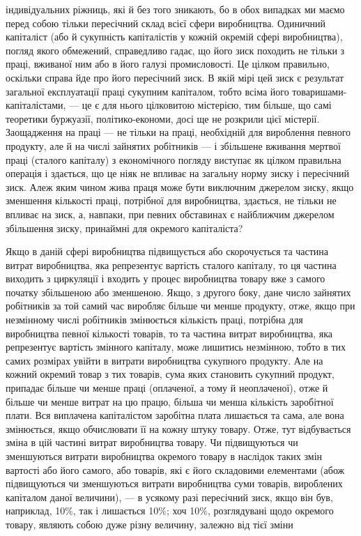 \parcont{}  %
індивідуальних ріжниць, які й без того зникають, бо в обох
випадках ми маємо перед собою тільки пересічний склад всієї
сфери виробництва. Одиничний капіталіст (або й сукупність капіталістів у кожній окремій сфері
виробництва), погляд якого
обмежений, справедливо гадає, що його зиск походить не тільки
з праці, вживаної ним або в його галузі промисловості. Це цілком правильно, оскільки справа йде про
його пересічний зиск.
В якій мірі цей зиск є результат загальної експлуатації праці
сукупним капіталом, тобто всіма його товаришами-капіталістами, — це є для нього цілковитою
містерією, тим більше, що самі теоретики буржуазії, політико-економи, досі ще не розкрили цієї
містерії. Заощадження на праці — не тільки на праці, необхідній
для вироблення певного продукту, але й на числі зайнятих робітників — і збільшене вживання мертвої
праці (сталого капіталу)
з економічного погляду виступає як цілком правильна операція і здається, що це ніяк не впливає на
загальну норму
зиску і пересічний зиск. Алеж яким чином жива праця може
бути виключним джерелом зиску, якщо зменшення кількості
праці, потрібної для виробництва, здається, не тільки не впливає на зиск, а, навпаки, при певних
обставинах є найближчим
джерелом збільшення зиску, принаймні для окремого капіталіста?

Якщо в даній сфері виробництва підвищується або скорочується та частина витрат виробництва, яка
репрезентує вартість
сталого капіталу, то ця частина виходить з циркуляції і входить
у процес виробництва товару вже з самого початку збільшеною або зменшеною. Якщо, з другого боку,
дане число зайнятих робітників за той самий час виробляє більше чи менше продукту, отже, якщо при
незмінному числі робітників змінюється кількість праці, потрібна для виробництва певної кількості
товарів, то та частина витрат виробництва, яка репрезентує вартість змінного капіталу, може лишитись
незмінною,
тобто в тих самих розмірах увійти в витрати виробництва сукупного продукту. Але на кожний окремий
товар з тих товарів, сума яких становить сукупний продукт, припадає більше чи менше праці
(оплаченої, а тому й неоплаченої), отже й більше
чи менше витрат на цю працю, більша чи менша кількість заробітної плати. Вся виплачена капіталістом
заробітна плата лишається та сама, але вона змінюється, якщо обчислювати її на кожну штуку товару.
Отже, тут відбувається зміна в цій частині
витрат виробництва товару. Чи підвищуються чи зменшуються витрати виробництва окремого товару в
наслідок таких змін вартості
або його самого, або товарів, які є його складовими елементами
(абож підвищуються чи зменшуються витрати виробництва суми
товарів, вироблених капіталом даної величини), — в усякому
разі пересічний зиск, якщо він був, наприклад, 10\%, так і лишається 10\%; хоч 10\%, розглядувані щодо
окремого товару,
являють собою дуже різну величину, залежно від тієї зміни
\parbreak{}  %
